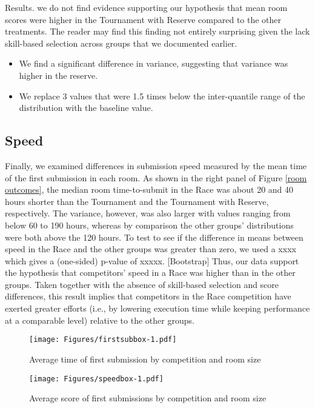 \documentclass[10pt, titlepage]{article}
\begin{document}
Results. we do not find evidence supporting our hypothesis that mean
room scores were higher in the Tournament with Reserve compared to the
other treatments. The reader may find this finding not entirely
surprising given the lack skill-based selection across groups that we
documented earlier.

\begin{itemize}
\item
  We find a significant difference in variance, suggesting that variance
  was higher in the reserve.
\item
  We replace 3 values that were 1.5 times below the inter-quantile range
  of the distribution with the baseline value.
\end{itemize}

\subsection{Speed}\label{speed}

Finally, we examined differences in submission speed measured by the
mean time of the first submission in each room. As shown in the right
panel of Figure \ref{room outcomes}, the median room time-to-submit in
the Race was about 20 and 40 hours shorter than the Tournament and the
Tournament with Reserve, respectively. The variance, however, was also
larger with values ranging from below 60 to 190 hours, whereas by
comparison the other groups' distributions were both above the 120
hours. To test to see if the difference in means between speed in the
Race and the other groups was greater than zero, we used a xxxx which
gives a (one-sided) p-value of xxxxx. {[}Bootstrap{]} Thus, our data
support the hypothesis that competitors' speed in a Race was higher than
in the other groups. Taken together with the absence of skill-based
selection and score differences, this result implies that competitors in
the Race competition have exerted greater efforts (i.e., by lowering
execution time while keeping performance at a comparable level) relative
to the other groups.

\begin{figure}
\caption{Average time of first submission by competition and room size}
\label{room entrants}
\texttt{[image: Figures/firstsubbox-1.pdf]}
\end{figure}

\begin{figure}
\caption{Average score of first submissions by competition and room size}
\label{room entrants}
\texttt{[image: Figures/speedbox-1.pdf]}
\end{figure}
\end{document}
